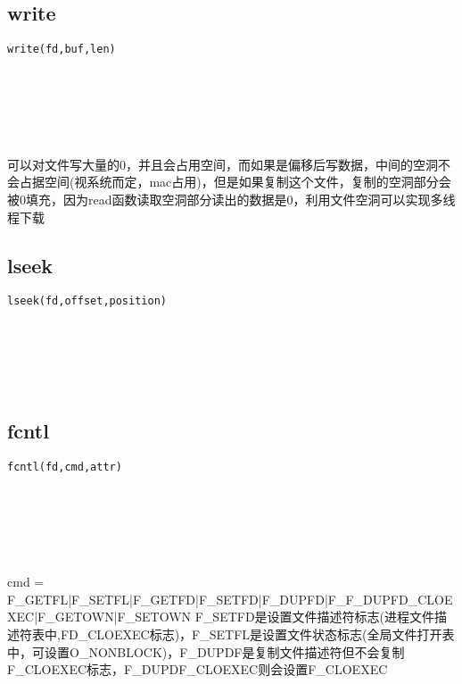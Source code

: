 \documentclass[10pt,a4paper]{article}
\begin{document}
\subsection{write}
\begin{spacing}{2.0}
\lstset{language=C,numbers=none}
\begin{lstlisting}
write(fd,buf,len)
\end{lstlisting}
{\large\color[rgb]{0.2,0.4,0.6}{fd:}} \\
{\large\color[rgb]{0.2,0.4,0.6}{buf:}} \\
{\large\color[rgb]{0.2,0.4,0.6}{len:}}
\paragraph{ \ \ }可以对文件写大量的0，并且会占用空间，而如果是偏移后写数据，中间的空洞不会占据空间(视系统而定，mac占用)，但是如果复制这个文件，复制的空洞部分会被0填充，因为read函数读取空洞部分读出的数据是0，利用文件空洞可以实现多线程下载
\end{spacing}

\subsection{lseek}
\begin{spacing}{2.0}
\lstset{language=C,numbers=none}
\begin{lstlisting}
lseek(fd,offset,position)
\end{lstlisting}
{\large\color[rgb]{0.2,0.4,0.6}{fd:}} \\
{\large\color[rgb]{0.2,0.4,0.6}{offset:}} \\
{\large\color[rgb]{0.2,0.4,0.6}{position:}}
\paragraph{ \ \ }
\end{spacing}

\subsection{fcntl}
\begin{spacing}{2.0}
\lstset{language=C,numbers=none}
\begin{lstlisting}
fcntl(fd,cmd,attr)
\end{lstlisting}
{\large\color[rgb]{0.2,0.4,0.6}{fd:}} \\
{\large\color[rgb]{0.2,0.4,0.6}{cmd:}} \\
{\large\color[rgb]{0.2,0.4,0.6}{attr:}}
\paragraph{ \ \ }cmd = F\_GETFL|F\_SETFL|F\_GETFD|F\_SETFD|F\_DUPFD|F\_F\_DUPFD\_CLOEXEC|F\_GETOWN|F\_SETOWN F\_SETFD是设置文件描述符标志(进程文件描述符表中,FD\_CLOEXEC标志)，F\_SETFL是设置文件状态标志(全局文件打开表中，可设置O\_NONBLOCK)，F\_DUPDF是复制文件描述符但不会复制F\_CLOEXEC标志，F\_DUPDF\_CLOEXEC则会设置F\_CLOEXEC
\end{spacing}
\end{document}
